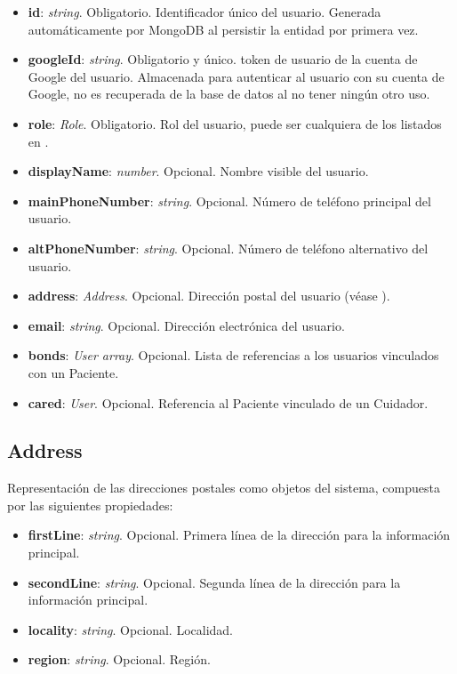 \begin{itemize}
    \item \textbf{id}: \emph{string}. Obligatorio. Identificador único del usuario. Generada automáticamente por MongoDB al persistir la entidad por primera vez.
    \item \textbf{googleId}: \emph{string}. Obligatorio y único. \Gls{token} de usuario de la cuenta de Google del usuario. Almacenada para autenticar al usuario con su cuenta de Google, no es recuperada de la base de datos al no tener ningún otro uso.
    \item \textbf{role}: \emph{Role}. Obligatorio. Rol del usuario, puede ser cualquiera de los listados en .
    \item \textbf{displayName}: \emph{number}. Opcional. Nombre visible del usuario.
    \item \textbf{mainPhoneNumber}: \emph{string}. Opcional. Número de teléfono principal del usuario.
    \item \textbf{altPhoneNumber}: \emph{string}. Opcional. Número de teléfono alternativo del usuario.
    \item \textbf{address}: \emph{Address}. Opcional. Dirección postal del usuario (véase ).
    \item \textbf{email}: \emph{string}. Opcional. Dirección electrónica del usuario.
    \item \textbf{bonds}: \emph{User array}. Opcional. Lista de referencias a los usuarios vinculados con un Paciente.
    \item \textbf{cared}: \emph{User}. Opcional. Referencia al Paciente vinculado de un Cuidador.
\end{itemize}

\subsection{Address}
\label{ss:address}

Representación de las direcciones postales como objetos del sistema, compuesta por las siguientes propiedades:

\begin{itemize}
    \item \textbf{firstLine}: \emph{string}. Opcional. Primera línea de la dirección para la información principal.
    \item \textbf{secondLine}: \emph{string}. Opcional. Segunda línea de la dirección para la información principal.
    \item \textbf{locality}: \emph{string}. Opcional. Localidad.
    \item \textbf{region}: \emph{string}. Opcional. Región.
\end{itemize}
